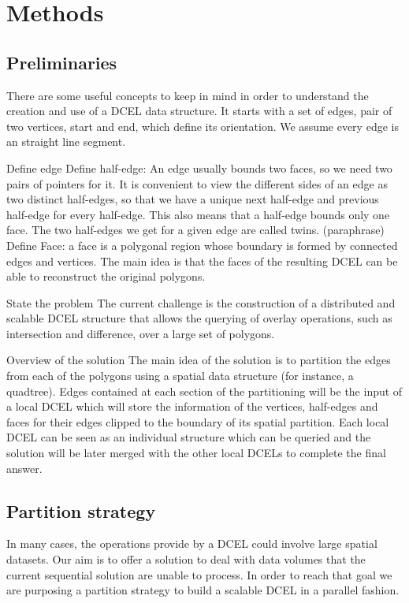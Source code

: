 \section{Methods} \label{sec:methods}

\subsection{Preliminaries}
There are some useful concepts to keep in mind in order to understand the creation and use of a DCEL data structure.  It starts with a set of edges, pair of two vertices, start and end, which define its orientation. We assume every edge is an straight line segment.

Define edge
Define half-edge: An edge usually bounds two faces, so we need two pairs of pointers for it. It is convenient to view the different sides of an edge as two distinct half-edges, so that we have a unique next half-edge and previous half-edge for every half-edge. This also means that a half-edge bounds only one face. The two half-edges we get for a given edge are called twins. (paraphrase)
Define Face: a face is a polygonal region whose boundary is formed by connected edges and vertices.  The main idea is that the faces of the resulting DCEL can be able to reconstruct the original polygons.

State the problem
The current challenge is the construction of a distributed and scalable DCEL structure that allows the querying of overlay operations, such as intersection and difference, over a large set of polygons.

Overview of the solution
The main idea of the solution is to partition the edges from each of the polygons using a spatial data structure (for instance, a quadtree).  Edges contained at each section of the partitioning will be the input of a local DCEL which will store the information of the vertices, half-edges and faces for their edges clipped to the boundary of its spatial partition.  Each local DCEL can be seen as an individual structure which can be queried and the solution will be later merged with the other local DCELs to complete the final answer. 

\subsection{Partition strategy} \label{sec:strategy}
In many cases, the operations provide by a DCEL could involve large spatial datasets.  Our aim is to offer a solution to deal with data volumes that the current sequential solution are unable to process.  In order to reach that goal we are purposing a partition strategy to build a scalable DCEL in a parallel fashion.  

